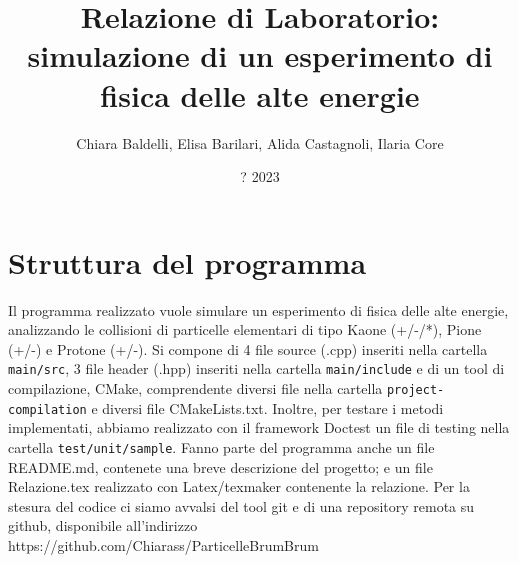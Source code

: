 \documentclass{article}
\title{\textbf{Relazione di Laboratorio: simulazione di un esperimento di fisica delle alte energie}}
\author{ Chiara Baldelli, Elisa Barilari, Alida Castagnoli, Ilaria Core}
\date{? 2023}
\begin{document}
\maketitle

\section{Struttura del programma} Il programma realizzato vuole simulare un esperimento di fisica delle alte energie, analizzando le collisioni di particelle elementari di tipo Kaone (+/-/*), Pione (+/-) e Protone (+/-). Si compone di 4 file source (.cpp) inseriti nella cartella \verb|main/src|, 3 file header (.hpp) inseriti nella cartella \verb|main/include| e di un tool di compilazione, CMake, comprendente diversi file nella cartella \verb|project-compilation| e diversi file CMakeLists.txt. Inoltre, per testare i metodi implementati, abbiamo realizzato con il framework Doctest un file di testing nella cartella \verb|test/unit/sample|. Fanno parte del programma anche un file README.md, contenete una breve descrizione del progetto; e un file Relazione.tex realizzato con Latex/texmaker contenente la relazione. Per la stesura del codice ci siamo avvalsi del tool git e di una repository remota su github, disponibile all'indirizzo https://github.com/Chiarass/ParticelleBrumBrum
\end{document}
